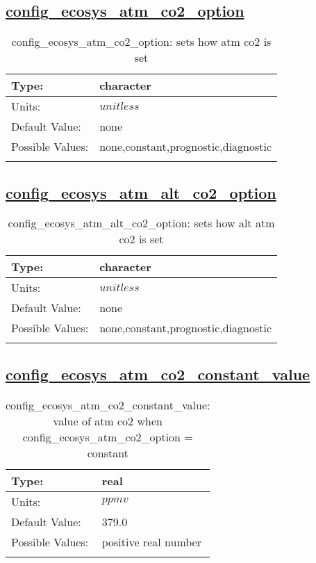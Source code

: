 \subsection[config\_ecosys\_atm\_co2\_option]{\hyperref[sec:nm_tab_tracer_forcing_ecosysTracers]{config\_ecosys\_atm\_co2\_option}}
\label{subsec:nm_sec_config_ecosys_atm_co2_option}
\begin{center}
\begin{longtable}{| p{2.0in} || p{4.0in} |}
    \hline
    Type: & character \\
    \hline
    Units: & $unitless$ \\
    \hline
    Default Value: & none \\
    \hline
    Possible Values: & none,constant,prognostic,diagnostic \\
    \hline
    \caption{config\_ecosys\_atm\_co2\_option: sets how atm co2 is set}
\end{longtable}
\end{center}
\subsection[config\_ecosys\_atm\_alt\_co2\_option]{\hyperref[sec:nm_tab_tracer_forcing_ecosysTracers]{config\_ecosys\_atm\_alt\_co2\_option}}
\label{subsec:nm_sec_config_ecosys_atm_alt_co2_option}
\begin{center}
\begin{longtable}{| p{2.0in} || p{4.0in} |}
    \hline
    Type: & character \\
    \hline
    Units: & $unitless$ \\
    \hline
    Default Value: & none \\
    \hline
    Possible Values: & none,constant,prognostic,diagnostic \\
    \hline
    \caption{config\_ecosys\_atm\_alt\_co2\_option: sets how alt atm co2 is set}
\end{longtable}
\end{center}
\subsection[config\_ecosys\_atm\_co2\_constant\_value]{\hyperref[sec:nm_tab_tracer_forcing_ecosysTracers]{config\_ecosys\_atm\_co2\_constant\_value}}
\label{subsec:nm_sec_config_ecosys_atm_co2_constant_value}
\begin{center}
\begin{longtable}{| p{2.0in} || p{4.0in} |}
    \hline
    Type: & real \\
    \hline
    Units: & $ppmv$ \\
    \hline
    Default Value: & 379.0 \\
    \hline
    Possible Values: & positive real number \\
    \hline
    \caption{config\_ecosys\_atm\_co2\_constant\_value: value of atm co2 when config\_ecosys\_atm\_co2\_option = constant}
\end{longtable}
\end{center}
